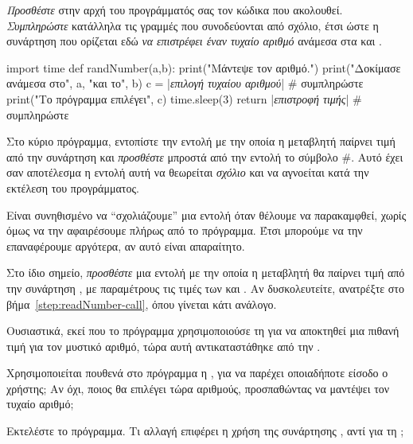 \documentclass[a4paper,11pt,oneside]{book}
\begin{document}
\begin{step}
\label{step:readNumber-call}
\emph{Προσθέστε} στην αρχή του προγράμματός σας τον κώδικα που ακολουθεί. \emph{Συμπληρώστε} κατάλληλα τις γραμμές που συνοδεύονται από σχόλιο, έτσι ώστε η συνάρτηση  που ορίζεται εδώ \emph{να επιστρέφει έναν τυχαίο αριθμό} ανάμεσα στα  και .

\begin{pynew}
import time
def randNumber(a,b):
    print("Μάντεψε τον αριθμό.")
    print("Δοκίμασε ανάμεσα στο", a, "και το", b)
    c = |\textrm{\textit{επιλογή τυχαίου αριθμού}}|             # συμπληρώστε
    print("Το πρόγραμμα επιλέγει", c)
    time.sleep(3)
    return |\textrm{\textit{επιστροφή τιμής}}|                # συμπληρώστε
\end{pynew}

Στο κύριο πρόγραμμα, εντοπίστε την εντολή με την οποία η μεταβλητή  παίρνει τιμή από την συνάρτηση  και \emph{προσθέστε} μπροστά από την εντολή το σύμβολο \#. Αυτό έχει σαν αποτέλεσμα η εντολή αυτή να θεωρείται \emph{σχόλιο} και να αγνοείται κατά την εκτέλεση του προγράμματος.

\begin{note}
Είναι συνηθισμένο να ``σχολιάζουμε'' μια εντολή όταν θέλουμε να παρακαμφθεί, χωρίς όμως να την αφαιρέσουμε πλήρως από το πρόγραμμα. Έτσι μπορούμε να την επαναφέρουμε αργότερα, αν αυτό είναι απαραίτητο.
\end{note}

Στο ίδιο σημείο, \emph{προσθέστε} μια εντολή με την οποία η μεταβλητή  θα παίρνει τιμή από την συνάρτηση , με παραμέτρους τις τιμές των  και . Αν δυσκολευτείτε, ανατρέξτε στο βήμα~\ref{step:readNumber-call}, όπου γίνεται κάτι ανάλογο.

Ουσιαστικά, εκεί που το πρόγραμμα χρησιμοποιούσε τη  για να αποκτηθεί μια πιθανή τιμή για τον μυστικό αριθμό, τώρα αυτή αντικαταστάθηκε από την .

Χρησιμοποιείται πουθενά στο πρόγραμμα η , για να παρέχει οποιαδήποτε είσοδο ο χρήστης; Αν όχι, ποιος θα επιλέγει τώρα αριθμούς, προσπαθώντας να μαντέψει τον τυχαίο αριθμό;

\marginnote[14pt]{\icondiscuss}
\dottedline

\dottedline

Εκτελέστε το πρόγραμμα. Τι αλλαγή επιφέρει η χρήση της συνάρτησης , αντί για τη ;

\clearpage
\marginnote[14pt]{\icondiscuss}
\dottedline

\dottedline
\end{step}
\end{document}
